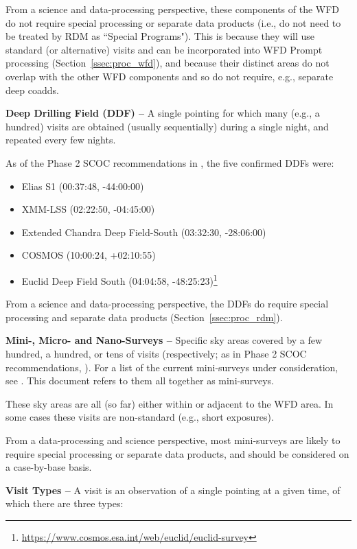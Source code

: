 From a science and data-processing perspective, these components of the 
WFD do not require special processing or separate data products 
(i.e., do not need to be treated by RDM as ``Special Programs").
This is because they will use standard (or alternative) visits and can
be incorporated into WFD Prompt processing (Section~\ref{ssec:proc_wfd}), 
and because their distinct areas do not overlap with the other WFD components 
and so do not require, e.g., separate deep coadds. 


\textbf{Deep Drilling Field (DDF) -- }
A single pointing for which many (e.g., a hundred) visits are obtained 
(usually sequentially) during a single night, and repeated every few 
nights.

As of the Phase 2 SCOC recommendations in , the five 
confirmed DDFs were:

\begin{itemize}
\item Elias S1 (00:37:48, -44:00:00)
\item XMM-LSS (02:22:50, -04:45:00)
\item Extended Chandra Deep Field-South (03:32:30, -28:06:00)
\item COSMOS (10:00:24, +02:10:55)
\item Euclid Deep Field South  (04:04:58, -48:25:23)\footnote{\url{https://www.cosmos.esa.int/web/euclid/euclid-survey}}
\end{itemize}

From a science and data-processing perspective, the DDFs do require 
special processing and separate data products (Section~\ref{ssec:proc_rdm}).


\textbf{Mini-, Micro- and Nano-Surveys -- }
Specific sky areas covered by a few hundred, a hundred, or tens of visits 
(respectively; as in Phase 2 SCOC recommendations, ).
For a list of the current mini-surveys under consideration, see 
.
This document refers to them all together as mini-surveys.

These sky areas are all (so far) either within or adjacent to the WFD area.
In some cases these visits are non-standard (e.g., short exposures).

From a data-processing and science perspective, most mini-surveys are 
likely to require special processing or separate data products, and should 
be considered on a case-by-base basis.


\textbf{Visit Types -- }
A visit is an observation of a single pointing at a given time, of which 
there are three types:

